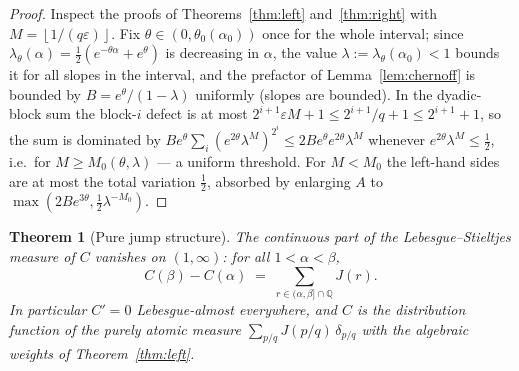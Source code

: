\documentclass[11pt]{article}
\newtheorem{theorem}{Theorem}
\theoremstyle{definition}
\theoremstyle{remark}
\newcommand{\floor}[1]{\left\lfloor #1 \right\rfloor}
\begin{document}
\begin{proof}
Inspect the proofs of Theorems~\ref{thm:left} and~\ref{thm:right} with
$M = \floor{1/(q\varepsilon)}$.
Fix $\theta \in (0, \theta_0(\alpha_0))$ once for the whole interval;
since $\lambda_\theta(\alpha) = \tfrac12(e^{-\theta\alpha} + e^\theta)$
is decreasing in $\alpha$, the value
$\lambda := \lambda_\theta(\alpha_0) < 1$ bounds it for all slopes in
the interval, and the prefactor of Lemma~\ref{lem:chernoff} is bounded
by $B = e^{\theta}/(1-\lambda)$ uniformly (slopes are bounded).
In the dyadic-block sum the block-$i$ defect is at most
$2^{i+1}\varepsilon M + 1 \leq 2^{i+1}/q + 1 \leq 2^{i+1} + 1$, so the
sum is dominated by
$B e^{\theta} \sum_i (e^{2\theta} \lambda^{M})^{2^i}
\leq 2 B e^{\theta} e^{2\theta} \lambda^{M}$
whenever $e^{2\theta}\lambda^{M} \leq \tfrac12$, i.e.\ for
$M \geq M_0(\theta, \lambda)$ --- a uniform threshold.
For $M < M_0$ the left-hand sides are at most the total variation
$\tfrac12$, absorbed by enlarging $A$ to
$\max(2Be^{3\theta}, \tfrac12 \lambda^{-M_0})$.
\end{proof}

\begin{theorem}[Pure jump structure]\label{thm:purejump}
The continuous part of the Lebesgue--Stieltjes measure of $C$ vanishes
on $(1, \infty)$: for all $1 < \alpha < \beta$,
\[
C(\beta) - C(\alpha) \;=\; \sum_{r \in (\alpha, \beta] \cap \mathbb{Q}}
J(r) .
\]
In particular $C' = 0$ Lebesgue-almost everywhere, and $C$ is the
distribution function of the purely atomic measure
$\sum_{p/q} J(p/q)\,\delta_{p/q}$ with the algebraic weights of
Theorem~\ref{thm:left}.
\end{theorem}
\end{document}
